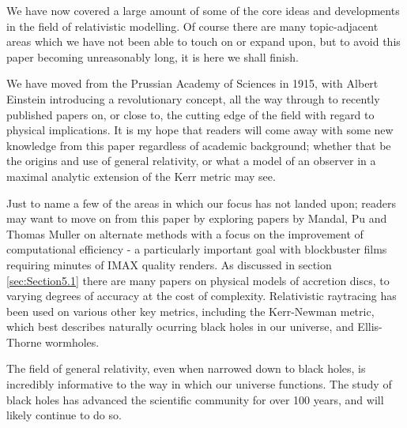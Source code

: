 \documentclass[oneside,openright,frontopenright, singlespacing]{dmathesis}
\begin{document}
\begin{conclusion}
	We have now covered a large amount of some of the core ideas and developments in the field of relativistic modelling. Of course there are many topic-adjacent areas which we have not been able to touch on or expand upon, but to avoid this paper becoming unreasonably long, it is here we shall finish. 

\vspace{1em}
	We have moved from the Prussian Academy of Sciences in 1915, with Albert Einstein introducing a revolutionary concept, all the way through to recently published papers on, or close to, the cutting edge of the field with regard to physical implications. It is my hope that readers will come away with some new knowledge from this paper regardless of academic background; whether that be the origins and use of general relativity, or what a model of an observer in a maximal analytic extension of the Kerr metric may see.

\vspace{1em}
	Just to name a few of the areas in which our focus has not landed upon; readers may want to move on from this paper by exploring papers by Mandal\cite{mandal2021non}, Pu\cite{pu2016odyssey} and Thomas Muller\cite{muller2021adaptive} on alternate methods with a focus on the improvement of computational efficiency - a particularly important goal with blockbuster films requiring minutes of IMAX quality renders. As discussed in section \ref{sec:Section5.1} there are many papers on physical models of accretion discs, to varying degrees of accuracy at the cost of complexity. Relativistic raytracing has been used on various other key metrics, including the Kerr-Newman metric, which best describes naturally ocurring black holes in our universe, and Ellis-Thorne wormholes\cite{thorne2015visualizing}.

\vspace{1em}
	 The field of general relativity, even when narrowed down to black holes, is incredibly informative to the way in which our universe functions. The study of black holes has advanced the scientific community for over 100 years, and will likely continue to do so.
\end{conclusion}


\appendix
\end{document}
